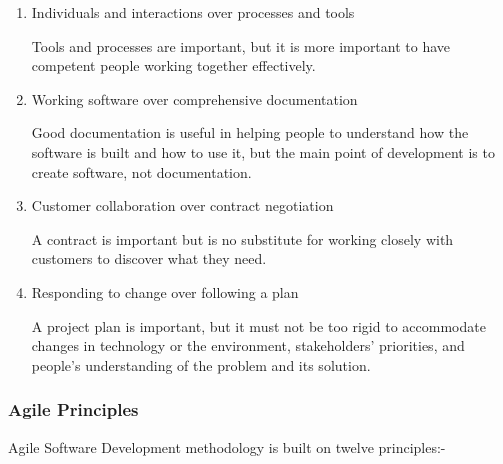 \begin{enumerate}
      \item Individuals and interactions over processes and tools

            Tools and processes are important, but it is more important to have competent people working together effectively.

      \item Working software over comprehensive documentation

            Good documentation is useful in helping people to understand how the software is built and how to use it, but the main point of development is to create software, not documentation.

      \item Customer collaboration over contract negotiation

            A contract is important but is no substitute for working closely with customers to discover what they need.

      \item Responding to change over following a plan

            A project plan is important, but it must not be too rigid to accommodate changes in technology or the environment, stakeholders' priorities, and people's understanding of the problem and its solution.

\end{enumerate}

\subsubsection{Agile Principles}

Agile Software Development methodology is built on twelve principles:-

